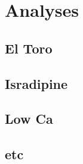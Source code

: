 \documentclass[a4paper,11pt,oneside,]{article}
\begin{document}
\section{Analyses}
\subsection{El Toro}
\subsection{Isradipine}
\subsection{Low Ca}
\subsection{etc}

\newpage


\end{document}

